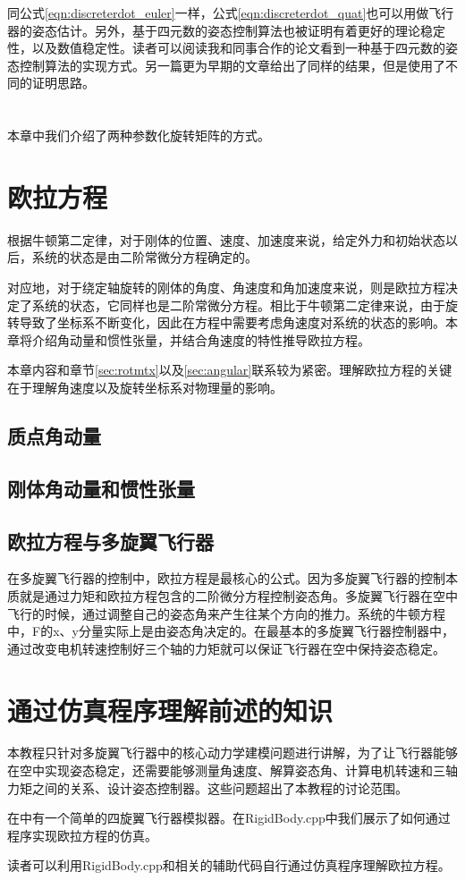 \documentclass[11pt]{article}
\begin{document}
同公式\ref{eqn:discreterdot_euler}一样，公式\ref{eqn:discreterdot_quat}也可以用做飞行器的姿态估计。另外，基于四元数的姿态控制算法也被证明有着更好的理论稳定性，以及数值稳定性。读者可以阅读我和同事合作的论文\cite{7139416}看到一种基于四元数的姿态控制算法的实现方式。另一篇更为早期的文章\cite{5717652}给出了同样的结果，但是使用了不同的证明思路。
\ \\
\ \\
\ \\
本章中我们介绍了两种参数化旋转矩阵的方式。

\section{欧拉方程}\label{sec:euler}
​根据牛顿第二定律，对于刚体的位置、速度、加速度来说，给定外力和初始状态以后，系统的状态是由二阶常微分方程确定的。

对应地，对于绕定轴旋转的刚体的角度、角速度和角加速度来说，则是欧拉方程决定了系统的状态，它同样也是二阶常微分方程。相比于牛顿第二定律来说，由于旋转导致了坐标系不断变化，因此在方程中需要考虑角速度对系统的状态的影响。本章将介绍角动量和惯性张量，并结合角速度的特性推导欧拉方程。

本章内容和章节\ref{sec:rotmtx}以及\ref{sec:angular}联系较为紧密。理解欧拉方程的关键在于理解角速度以及旋转坐标系对物理量的影响。
\subsection{质点角动量}
\subsection{刚体角动量和惯性张量}
\subsection{欧拉方程与多旋翼飞行器}
在多旋翼飞行器的控制中，欧拉方程是最核心的公式。因为多旋翼飞行器的控制本质就是通过力矩和欧拉方程包含的二阶微分方程控制姿态角。多旋翼飞行器在空中飞行的时候，通过调整自己的姿态角来产生往某个方向的推力。系统的牛顿方程中，F的x、y分量实际上是由姿态角决定的。在最基本的多旋翼飞行器控制器中，通过改变电机转速控制好三个轴的力矩就可以保证飞行器在空中保持姿态稳定。
\section{通过仿真程序理解前述的知识}
本教程只针对多旋翼飞行器中的核心动力学建模问题进行讲解，为了让飞行器能够在空中实现姿态稳定，还需要能够测量角速度、解算姿态角、计算电机转速和三轴力矩之间的关系、设计姿态控制器。这些问题超出了本教程的讨论范围。

在中有一个简单的四旋翼飞行器模拟器。在RigidBody.cpp中我们展示了如何通过程序实现欧拉方程的仿真。

读者可以利用RigidBody.cpp和相关的辅助代码自行通过仿真程序理解欧拉方程。


\end{document}

